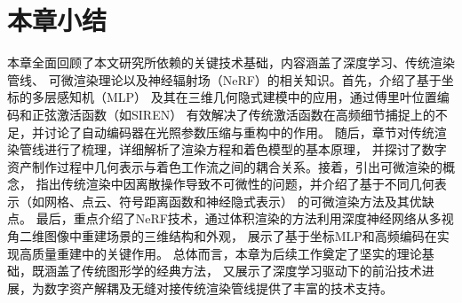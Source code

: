 \section{本章小结}
本章全面回顾了本文研究所依赖的关键技术基础，内容涵盖了深度学习、传统渲染管线、
可微渲染理论以及神经辐射场（NeRF）的相关知识。首先，介绍了基于坐标的多层感知机（MLP）
及其在三维几何隐式建模中的应用，通过傅里叶位置编码和正弦激活函数（如SIREN）
有效解决了传统激活函数在高频细节捕捉上的不足，并讨论了自动编码器在光照参数压缩与重构中的作用。
随后，章节对传统渲染管线进行了梳理，详细解析了渲染方程和着色模型的基本原理，
并探讨了数字资产制作过程中几何表示与着色工作流之间的耦合关系。接着，引出可微渲染的概念，
指出传统渲染中因离散操作导致不可微性的问题，并介绍了基于不同几何表示（如网格、点云、符号距离函数和神经隐式表示）
的可微渲染方法及其优缺点。
最后，重点介绍了NeRF技术，通过体积渲染的方法利用深度神经网络从多视角二维图像中重建场景的三维结构和外观，
展示了基于坐标MLP和高频编码在实现高质量重建中的关键作用。
总体而言，本章为后续工作奠定了坚实的理论基础，既涵盖了传统图形学的经典方法，
又展示了深度学习驱动下的前沿技术进展，为数字资产解耦及无缝对接传统渲染管线提供了丰富的技术支持。


